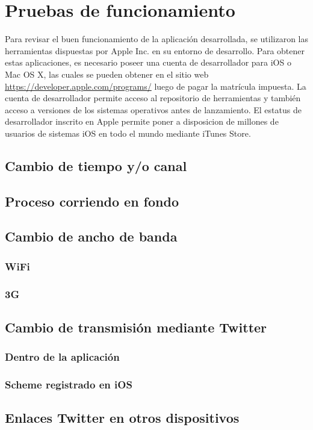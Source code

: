 
\chapter{Pruebas de funcionamiento}

Para revisar el buen funcionamiento de la aplicación desarrollada, se utilizaron las herramientas dispuestas por Apple Inc.  en su entorno de desarrollo. Para obtener estas aplicaciones, es necesario poseer una cuenta de desarrollador para iOS o Mac OS X, las cuales se pueden obtener en el sitio web \url{https://developer.apple.com/programs/} luego de pagar la matrícula impuesta.
La cuenta de desarrollador permite acceso al repositorio de herramientas y también acceso a versiones de los sistemas operativos antes de lanzamiento.
El estatus de desarrollador inscrito en Apple permite poner a disposicion de millones de usuarios de sistemas iOS en todo el mundo mediante iTunes Store.
\section{Cambio de tiempo y/o canal}
\section{Proceso corriendo en fondo} %
\section{Cambio de ancho de banda}
  \subsection{WiFi}
  \subsection{3G}
\section{Cambio de transmisión mediante Twitter}
  \subsection{Dentro de la aplicación}
  \subsection{Scheme registrado en iOS}
\section{Enlaces Twitter en otros dispositivos}
